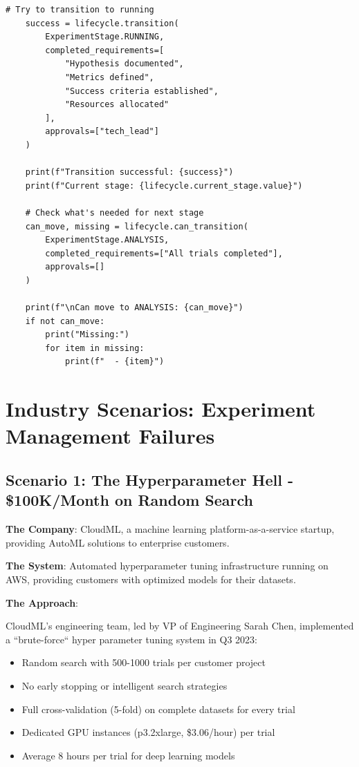 \begin{lstlisting}[style=python, caption={Experiment lifecycle management}]
    # Try to transition to running
    success = lifecycle.transition(
        ExperimentStage.RUNNING,
        completed_requirements=[
            "Hypothesis documented",
            "Metrics defined",
            "Success criteria established",
            "Resources allocated"
        ],
        approvals=["tech_lead"]
    )

    print(f"Transition successful: {success}")
    print(f"Current stage: {lifecycle.current_stage.value}")

    # Check what's needed for next stage
    can_move, missing = lifecycle.can_transition(
        ExperimentStage.ANALYSIS,
        completed_requirements=["All trials completed"],
        approvals=[]
    )

    print(f"\nCan move to ANALYSIS: {can_move}")
    if not can_move:
        print("Missing:")
        for item in missing:
            print(f"  - {item}")
\end{lstlisting}

\section{Industry Scenarios: Experiment Management Failures}

\subsection{Scenario 1: The Hyperparameter Hell - \$100K/Month on Random Search}

\textbf{The Company}: CloudML, a machine learning platform-as-a-service startup, providing AutoML solutions to enterprise customers.

\textbf{The System}: Automated hyperparameter tuning infrastructure running on AWS, providing customers with optimized models for their datasets.

\textbf{The Approach}:

CloudML's engineering team, led by VP of Engineering Sarah Chen, implemented a ``brute-force`` hyper parameter tuning system in Q3 2023:
\begin{itemize}
    \item Random search with 500-1000 trials per customer project
    \item No early stopping or intelligent search strategies
    \item Full cross-validation (5-fold) on complete datasets for every trial
    \item Dedicated GPU instances (p3.2xlarge, \$3.06/hour) per trial
    \item Average 8 hours per trial for deep learning models
\end{itemize}

